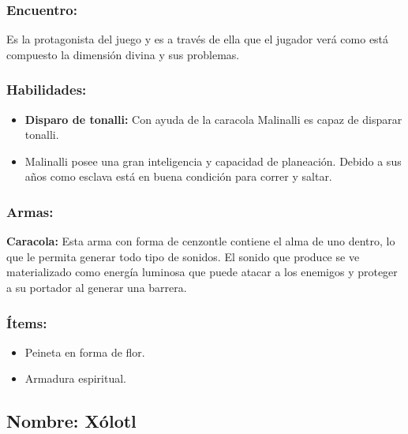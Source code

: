 \documentclass[11pt,letterpaper]{article}
\begin{document}
\subsubsection{Encuentro:}
Es la protagonista del juego y es a través de ella que el jugador verá como está compuesto la dimensión divina y sus problemas. 

\subsubsection{Habilidades:}
\begin{itemize}
	\item \textbf{Disparo de tonalli:} Con ayuda de la caracola Malinalli es capaz de disparar tonalli.
	\item Malinalli posee una gran inteligencia y capacidad de planeación. Debido a sus años como esclava está en buena condición para correr y saltar.
\end{itemize} 
\subsubsection{Armas:}
\textbf{Caracola:} Esta arma con forma de cenzontle contiene el alma de uno dentro, lo que le permita generar todo tipo de sonidos. El sonido que produce se ve materializado como energía luminosa que puede atacar a los enemigos y proteger a su portador al generar una barrera. 
\subsubsection{Ítems:}
\begin{itemize}
	\item Peineta en forma de flor.
	\item Armadura espiritual.
\end{itemize}

\subsection{Nombre: Xólotl}  \label{per.xolotl}
\end{document}
